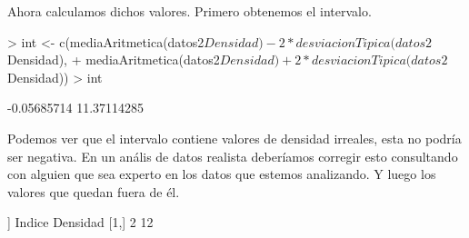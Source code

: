 \documentclass [a4paper] {article}
\begin{document}
Ahora calculamos dichos valores.
Primero obtenemos el intervalo.
\begin{Schunk}
\begin{Sinput}
> int <- c(mediaAritmetica(datos2$Densidad) - 2*desviacionTipica(datos2$Densidad),
+          mediaAritmetica(datos2$Densidad) + 2*desviacionTipica(datos2$Densidad))
> int
\end{Sinput}
\begin{Soutput}
[1] -0.05685714 11.37114285
\end{Soutput}
\end{Schunk}
Podemos ver que el intervalo contiene valores de densidad irreales, esta no podría ser negativa.
En un anális de datos realista deberíamos corregir esto consultando con alguien que sea experto en los datos que estemos analizando.
Y luego los valores que quedan fuera de él.
\begin{Schunk}
\begin{Soutput}
[[1]]
     Indice Densidad
[1,]      2       12
\end{Soutput}
\end{Schunk}
\end{document}
